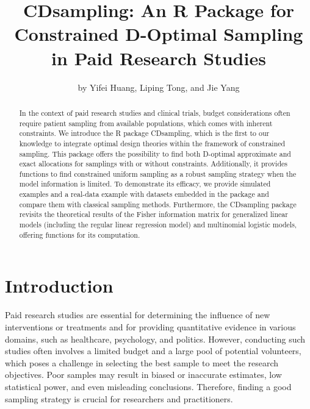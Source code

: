 \title{CDsampling: An R Package for Constrained D-Optimal Sampling in Paid Research Studies}
\author{by Yifei Huang, Liping Tong, and Jie Yang}

\maketitle

\begin{abstract}
  In the context of paid research studies and clinical trials, budget considerations often require patient sampling from available populations, which comes with inherent constraints. We introduce the R package CDsampling, which is the first to our knowledge to integrate optimal design theories within the framework of constrained sampling. This package offers the possibility to find both D-optimal approximate and exact allocations for samplings with or without constraints. Additionally, it provides functions to find constrained uniform sampling as a robust sampling strategy when the model information is limited. To demonstrate its efficacy, we provide simulated examples and a real-data example with datasets embedded in the package and compare them with classical sampling methods. Furthermore, the CDsampling package revisits the theoretical results of the Fisher information matrix for generalized linear models (including the regular linear regression model) and multinomial logistic models, offering functions for its computation.
\end{abstract}

\section{Introduction}\label{sec:intro}

Paid research studies are essential for determining the influence of new interventions or treatments and for providing quantitative evidence in various domains, such as healthcare, psychology, and politics. However, conducting such studies often involves a limited budget and a large pool of potential volunteers, which poses a challenge in selecting the best sample to meet the research objectives. Poor samples may result in biased or inaccurate estimates, low statistical power, and even misleading conclusions. Therefore, finding a good sampling strategy is crucial for researchers and practitioners.

